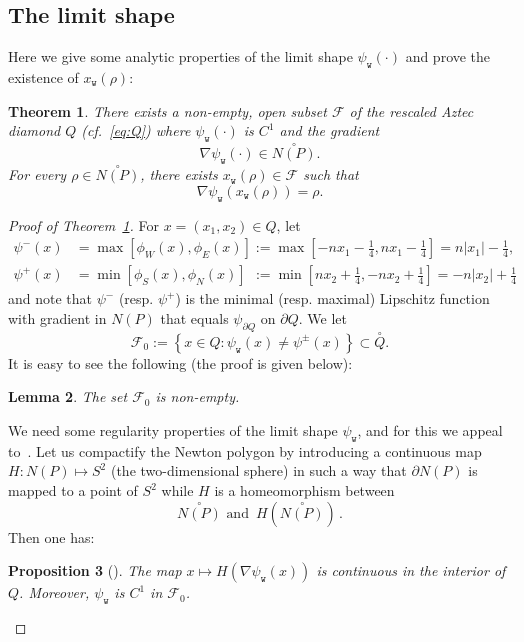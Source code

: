 \documentclass[10pt]{amsart}
\newtheorem{theo}{Theorem}[section]
\newtheorem{lemm}[theo]{Lemma}\newtheorem{prop}[theo]{Proposition}\newtheorem{coro}[theo]{Corollary}\newtheorem{conj}[theo]{Conjecture}
\theoremstyle{definition}\newtheorem{defi}[theo]{Definition}\newtheorem{rema}[theo]{Remark}\newtheorem{exam}[theo]{Example}\newtheorem{exem}[theo]{Example}\newtheorem{nota}[theo]{Notation}
\newcommand{\ttw}{\mathtt{w}}
\newcommand{\clF}{\mathcal{F}}
\begin{document}
\subsection{The limit shape}
Here we give some analytic properties of the limit shape $\psi_{\ttw}(\cdot)$ and prove the existence of $x_{\ttw}(\rho)$:
\begin{theo}\label{prop:KO}
There exists a non-empty, open subset $\clF$ of the rescaled Aztec diamond $Q$ (cf.~\eqref{eq:Q}) where $\psi_{\ttw}(\cdot)$ is $C^1$ and the gradient
\[\nabla \psi_{\ttw}(\cdot)\in \stackrel \circ{ N(P)}.
\]
For every $\rho\in \stackrel\circ{N(P)}$, there exists $x_{\ttw}(\rho)\in \clF$ such that
\[
\nabla \psi_{\ttw}(x_{\ttw}(\rho))=\rho.
\]
\end{theo}



\begin{proof}[Proof of Theorem~\ref{prop:KO}]
For $x=(x_1,x_2)\in Q$, let
\begin{equation}\label{eq:minmax}
\begin{aligned}
\psi^-(x) &=\max\left[\phi_W(x),\phi_E(x)\right] :=\max\left[-n x_1-\frac14, n{x_1}-\frac14\right] =n{|x_1|}-\frac14,\\
\psi^+(x) &=\min\left[\phi_S(x),\phi_N(x)\right]\:\,:=\min\left[n{x_2}+\frac14,-n{x_2}+\frac14\right] =-n{|x_2|}+\frac14
\end{aligned}
\end{equation}
and note that $\psi^-$ (resp. $\psi^+$) is the minimal (resp. maximal) Lipschitz function with gradient in $N(P)$ that equals $\psi_{\partial Q}$ on $\partial Q.$ We let
\begin{equation}\label{eq:mathcalF}
\clF_0:=\left\{x\in Q: \psi_{\ttw}(x)\ne \psi^\pm(x)\right\}\subset \stackrel \circ Q.
\end{equation}
It is easy to see the following (the proof is given below):
\begin{lemm}\label{lemma:pro}
The set $\clF_0$ is non-empty.
\end{lemm}

We need some regularity properties of the limit shape $\psi_{\ttw}$, and for this we appeal to~\cite{Duse,SS10}. Let us compactify the Newton polygon by introducing a continuous map $H:N(P)\mapsto S^2$ (the two-dimensional sphere) in such a way that $\partial N(P)$ is mapped to a point of $S^2$ while $H$ is a homeomorphism between
\[
\stackrel\circ{N(P)}\text{ and }\,H(\stackrel\circ{N(P)})\,.
\]
Then one has:

\begin{prop}[{\cite[Theorems~4.1 and~1.3]{SS10}\label{prop:compactify}}]
The map $x\mapsto H(\nabla\psi_{\ttw}(x))$ is continuous in the interior of $Q$. Moreover, $\psi_{\ttw}$ is $C^1$ in $\clF_0$.
\end{prop}



\end{proof}
\end{document}
